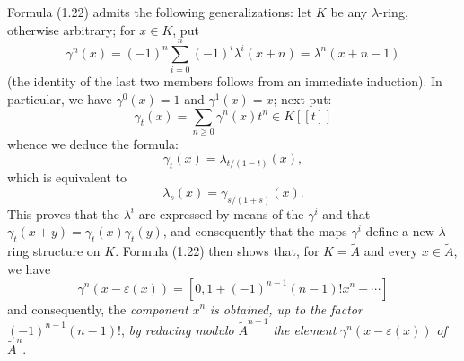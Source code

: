 %
Formula
(1.22) admits the following generalizations: let $K$ be any $\lambda$-ring, otherwise arbitrary; for $x\in K$, put
\begin{equation}\tag{1.23}
\gamma^n(x)=(-1)^n\sum_{i=0}^n(-1)^i\lambda^i(x+n)=\lambda^n(x+n-1)
\end{equation}
(the identity of the last two members follows from an immediate induction). In particular, we have $\gamma^0(x)=1$ and $\gamma^1(x)=x$; next put:
\begin{equation}\tag{1.24}
\gamma_t(x)=\sum_{n\geq0}\gamma^n(x)t^n\in K[[t]]
\end{equation}
whence we deduce the formula:
\begin{equation}\tag{1.25}
\gamma_t(x)=\lambda_{t/(1-t)}(x),
\end{equation}
which is equivalent to
\begin{equation}\tag{1.25 bis}
\lambda_s(x)=\gamma_{s/(1+s)}(x).
\end{equation}
This proves that the $\lambda^i$ are expressed by means of the $\gamma^i$ and that $\gamma_t(x+y)=\gamma_t(x)\gamma_t(y)$, and consequently that the maps $\gamma^i$ define a new $\lambda$-ring structure on $K$. Formula (1.22) then shows that, for $K=\widetilde A$ and every $x\in\widetilde A$, we have
\begin{equation}\tag{1.22 bis}
\gamma^n(x-\varepsilon(x))=[0,1+(-1)^{n-1}(n-1)!x^n+\cdots]
\end{equation}
and consequently, the \emph{component} $x^n$ \emph{is obtained, up to the factor} $(-1)^{n-1}(n-1)!$, \emph{by reducing modulo} $\widetilde A^{n+1}$ \emph{the element} $\gamma^n(x-\varepsilon(x))$ \emph{of} $\widetilde A^n$.


